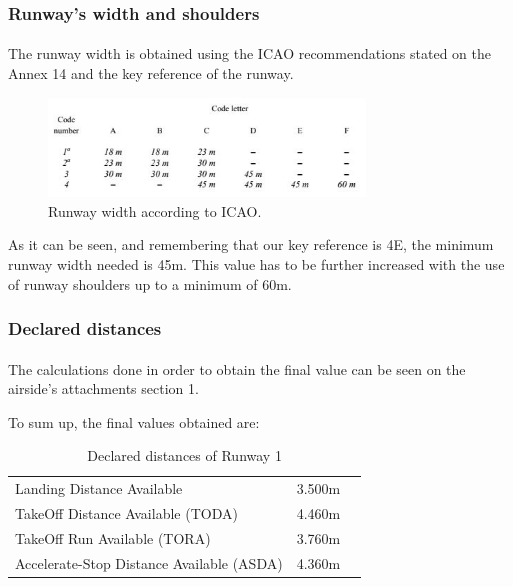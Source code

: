 			\subsubsection{Runway's width and shoulders}
			\paragraph{}The runway width is obtained using the ICAO recommendations stated on the Annex 14 and the key reference of the runway. 
			
			\begin{figure}[H]
				\centering
				\includegraphics[clip, trim=0cm 0cm 0cm 0cm, width=0.75\textwidth]{./images/Annex14/RunwayWidth}
				\caption{Runway width according to ICAO.} %
				\label{} %
			\end{figure}
		
			As it can be seen, and remembering that our key reference is 4E, the minimum runway width needed is 45m. This value has to be further increased with the use of runway shoulders up to a minimum of 60m. 

			\subsubsection{Declared distances}
			\paragraph{} The calculations done in order to obtain the final value can be seen on the airside’s attachments section 1. 
			
			To sum up, the final values obtained are:
			
			\begin{table}[htb]
				\centering
				\begin{tabular}{ll p{5cm}}
					\midrule[2pt]
					Landing Distance Available & 3.500m\\
					TakeOff Distance Available (TODA) & 4.460m\\
					TakeOff Run Available (TORA)& 3.760m \\
					Accelerate-Stop Distance Available (ASDA)& 4.360m\\
					\bottomrule[2pt]
				\end{tabular}
				\caption{Declared distances of  Runway 1}
				\label{DeclareddistancesRW1}
			\end{table}
			

